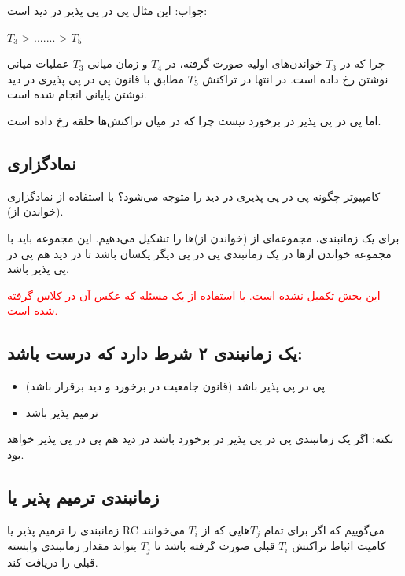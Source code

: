 \documentclass[a4paper]{article}
\begin{document}
جواب: این مثال پی در پی پذیر در دید است:

\begin{LTR}
    $T_{3}$ > ....... > $T_{5}$
\end{LTR}

چرا که در $T_{3}$ خواندن‌های اولیه صورت گرفته، در $T_{4}$ و زمان میانی $T_{3}$
عملیات میانی نوشتن رخ داده است. در انتها در تراکنش $T_{5}$ مطابق با قانون پی در
پی پذیری در دید نوشتن پایانی انجام شده است.

اما پی در پی پذیر در برخورد نیست چرا که در میان تراکنش‌ها حلقه رخ داده است.


\newpage

\subsection{نمادگزاری}

کامپیوتر چگونه پی در پی پذیری در دید را متوجه می‌شود؟ با استفاده از نمادگزاری (خواندن از).

برای یک زمانبندی، مجموعه‌ای از (خواندن از‌)ها را تشکیل می‌دهیم. این مجموعه باید
با مجموعه خواندن از‌ها در یک زمانبندی پی در پی دیگر یکسان باشد تا در دید هم پی
در پی پذیر باشد.

\textcolor{red}{این بخش تکمیل نشده است. با استفاده از یک مسئله که عکس آن در کلاس
گرفته شده است.}


\subsection{یک زمانبندی ۲ شرط دارد که درست باشد:}

\begin{itemize}
    \item پی در پی پذیر باشد (قانون جامعیت در برخورد و دید برقرار باشد)
    \item ترمیم پذیر باشد
\end{itemize}

نکته: اگر یک زمانبندی پی در پی پذیر در برخورد باشد در دید هم پی در پی پذیر خواهد بود.

\subsection{زمانبندی ترمیم پذیر یا }

زمانبندی را ترمیم پذیر یا RC می‌گوییم که اگر برای تمام $T_{j}$هایی که از $T_{i}$
می‌خوانند کامیت اثباط تراکنش $T_{i}$ قبلی صورت گرفته باشد تا $T_{j}$ بتواند
مقدار زمانبندی وابسته قبلی را دریافت کند.
\end{document}
